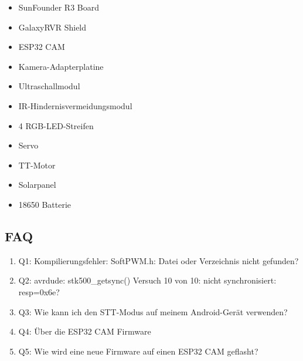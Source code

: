 \documentclass{vorlage-design-main}
\begin{document}
\begin{itemize}

\item
  SunFounder R3 Board
\item
  GalaxyRVR Shield
\item
  ESP32 CAM
\item
  Kamera-Adapterplatine
\item
  Ultraschallmodul
\item
  IR-Hindernisvermeidungsmodul
\item
  4 RGB-LED-Streifen
\item
  Servo
\item
  TT-Motor
\item
  Solarpanel
\item
  18650 Batterie
\end{itemize}

\hypertarget{faq}{%
\subsection{FAQ}\label{faq}}

\begin{enumerate}
\def\labelenumi{\arabic{enumi}.}

\item
  Q1: Kompilierungsfehler: SoftPWM.h: Datei oder Verzeichnis nicht
  gefunden?
\item
  Q2: avrdude: stk500\_getsync() Versuch 10 von 10: nicht
  synchronisiert: resp=0x6e?
\item
  Q3: Wie kann ich den STT-Modus auf meinem Android-Gerät verwenden?
\item
  Q4: Über die ESP32 CAM Firmware
\item
  Q5: Wie wird eine neue Firmware auf einen ESP32 CAM geflasht?
\end{enumerate} %


\clearpage
\printbibliography
\end{document}
